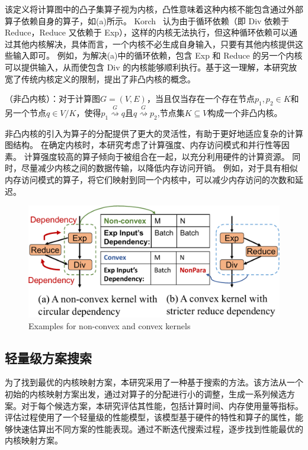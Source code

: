 该定义将计算图中的凸子集算子视为内核，凸性意味着这种内核不能包含通过外部算子依赖自身的算子，如(a)所示。
Korch~\cite{hu2024korch} 认为由于循环依赖（即 Div 依赖于 Reduce，Reduce 又依赖于 Exp），这样的内核无法执行，但这种循环依赖可以通过其他内核解决，具体而言，一个内核不必生成自身输入，只要有其他内核提供这些输入即可。
例如，为解决(a)中的循环依赖，包含 Exp 和 Reduce 的另一个内核可以提供输入，从而使包含 Div 的内核能够顺利执行。基于这一理解，本研究放宽了传统内核定义的限制，提出了非凸内核的概念。

\vspace{0.5em}
\begin{definition}（非凸内核）：对于计算图\(G=(V, E)\)，当且仅当存在一个存在节点\(p_{1}, p_{2} \in K\)和另一个节点\(q \in V/K\)，使得\(p_{1} \stackrel{G}{\rightsquigarrow } q\)且\(q \stackrel{G}{\rightsquigarrow} p_{2}\),节点集\(K \subseteq V\)构成一个非凸内核。
\end{definition}
\vspace{0.5em}

非凸内核的引入为算子的分配提供了更大的灵活性，有助于更好地适应复杂的计算图结构。
在确定内核时，本研究考虑了计算强度、内存访问模式和并行性等因素。
计算强度较高的算子倾向于被组合在一起，以充分利用硬件的计算资源。
同时，尽量减少内核之间的数据传输，以降低内存访问开销。
例如，对于具有相似内存访问模式的算子，将它们映射到同一个内核中，可以减少内存访问的次数和延迟。

\begin{figure}[h]
    \centering
    \includegraphics[width=0.6\linewidth]{figures/flashtensor/kernel_def_diff-crop.pdf}
    \caption{Examples for non-convex and convex kernels}
    \label{fig:kernel_def_diff}
\end{figure}


\subsection{轻量级方案搜索}
为了找到最优的内核映射方案，本研究采用了一种基于搜索的方法。该方法从一个初始的内核映射方案出发，通过对算子的分配进行小的调整，生成一系列候选方案。对于每个候选方案，本研究评估其性能，包括计算时间、内存使用量等指标。评估过程使用了一个轻量级的性能模型，该模型基于硬件的特性和算子的属性，能够快速估算出不同方案的性能表现。通过不断迭代搜索过程，逐步找到性能最优的内核映射方案。

